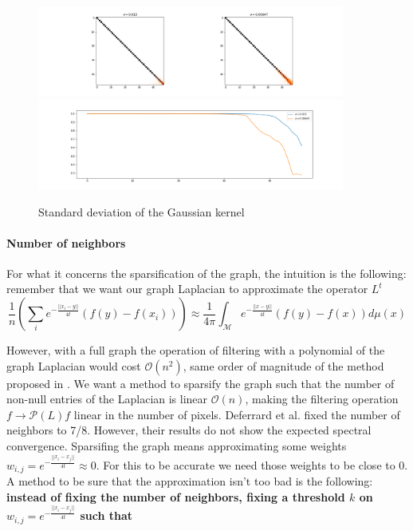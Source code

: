 \begin{figure}[h]
	\label{fig:t_sensitity}
	\caption{Standard deviation of the Gaussian kernel}
	\centering
	\includegraphics[width=0.9\textwidth]{../codes/06_figures/t_sensitivity.png}
	\includegraphics[width=0.9\textwidth]{../codes/06_figures/t_sensitivity_diagonal.png}
\end{figure}


\paragraph{Number of neighbors}
For what it concerns the sparsification of the graph, the intuition is the following: remember that we want our graph Laplacian to approximate the operator $L^t$
$$\frac{1}{n}\left(\sum_i e^{-\frac{||x_i-y||}{4t}}(f(y)-f(x_i)) \right) \approx \frac{1}{ 4\pi}\int_\mathcal M e^{-\frac{||x-y||}{4t}}\left(f(y)-f(x)\right)d\mu(x) $$

However, with a full graph the operation of filtering with a polynomial of the graph Laplacian would cost $\mathcal O (n^2)$, same order of magnitude of the method proposed in \cite{bibid}. We want a method to sparsify the graph such that the number of non-null entries of the Laplacian is linear $\mathcal O (n)$, making the filtering operation $f\rightarrow \mathcal P(L)f$ linear in the number of pixels. Deferrard et al. \cite{bibid} fixed the number of neighbors to 7/8. However, their results do not show the expected spectral convergence.
Sparsifing the graph means approximating some weights $w_{i,j}=e^{-\frac{||x_i-x_j||}{4t}} \approx 0$. For this to be accurate we need those weights to be close to 0. A method to be sure that the approximation isn't too bad is the following: \textbf{instead of fixing the number of neighbors, fixing a threshold $k$ on $w_{i,j}=e^{-\frac{||x_i-x_j||}{4t}}$ such that} 
	
